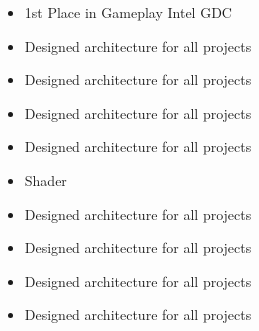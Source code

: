 \documentclass[10pt,a4paper]{altacv}
\begin{document}
\divider

\begin{itemize}
	
	\item 1st Place in Gameplay Intel GDC
	\item Designed architecture for all projects
	\item Designed architecture for all projects
	\item Designed architecture for all projects
	\item Designed architecture for all projects
\end{itemize}

\divider

\begin{itemize}
	
	\item Shader
	\item Designed architecture for all projects
	\item Designed architecture for all projects
	\item Designed architecture for all projects
	\item Designed architecture for all projects
\end{itemize}



\nocite{*}








\end{document}

